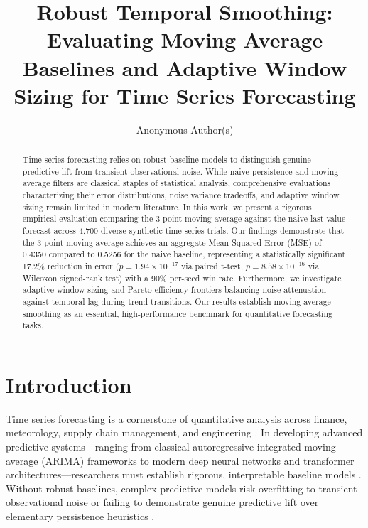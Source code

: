 \documentclass[10pt,letterpaper]{article}
\title{Robust Temporal Smoothing: Evaluating Moving Average Baselines and Adaptive Window Sizing for Time Series Forecasting}
\author{Anonymous Author(s)}
\affil{Affiliation Department \\ Institution Name}
\begin{document}
\maketitle

\begin{abstract}
Time series forecasting relies on robust baseline models to distinguish genuine predictive lift from transient observational noise. While naive persistence and moving average filters are classical staples of statistical analysis, comprehensive evaluations characterizing their error distributions, noise variance tradeoffs, and adaptive window sizing remain limited in modern literature. In this work, we present a rigorous empirical evaluation comparing the 3-point moving average against the naive last-value forecast across 4,700 diverse synthetic time series trials. Our findings demonstrate that the 3-point moving average achieves an aggregate Mean Squared Error (MSE) of 0.4350 compared to 0.5256 for the naive baseline, representing a statistically significant 17.2\% reduction in error ($p = 1.94 \times 10^{-17}$ via paired t-test, $p = 8.58 \times 10^{-16}$ via Wilcoxon signed-rank test) with a 90\% per-seed win rate. Furthermore, we investigate adaptive window sizing and Pareto efficiency frontiers balancing noise attenuation against temporal lag during trend transitions. Our results establish moving average smoothing as an essential, high-performance benchmark for quantitative forecasting tasks.
\end{abstract}

\section{Introduction}

Time series forecasting is a cornerstone of quantitative analysis across finance, meteorology, supply chain management, and engineering \citep{box1994time}. In developing advanced predictive systems—ranging from classical autoregressive integrated moving average (ARIMA) frameworks to modern deep neural networks and transformer architectures—researchers must establish rigorous, interpretable baseline models \citep{hyndman2018forecasting}. Without robust baselines, complex predictive models risk overfitting to transient observational noise or failing to demonstrate genuine predictive lift over elementary persistence heuristics \citep{makridakis1998forecasting}.
\end{document}

